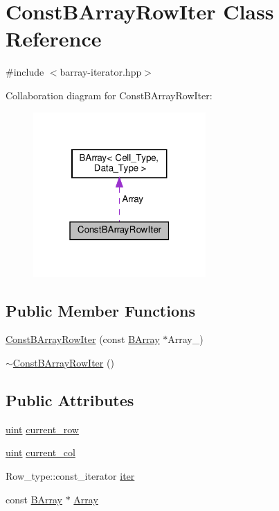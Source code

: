 \hypertarget{class_const_b_array_row_iter}{}\section{Const\+B\+Array\+Row\+Iter Class Reference}
\label{class_const_b_array_row_iter}


{\ttfamily \#include $<$barray-\/iterator.\+hpp$>$}



Collaboration diagram for Const\+B\+Array\+Row\+Iter\+:\nopagebreak
\begin{figure}[H]
\begin{center}
\leavevmode
\includegraphics[width=187pt]{class_const_b_array_row_iter__coll__graph}
\end{center}
\end{figure}
\subsection*{Public Member Functions}
\begin{DoxyCompactItemize}
\item 
\hyperlink{class_const_b_array_row_iter_a12fff3688dc55bdb336f5504736b6ebc}{Const\+B\+Array\+Row\+Iter} (const \hyperlink{class_b_array}{B\+Array} $\ast$Array\+\_\+)
\item 
\hyperlink{class_const_b_array_row_iter_aca51d35c5730466345e4c8bb303f619e}{$\sim$\+Const\+B\+Array\+Row\+Iter} ()
\end{DoxyCompactItemize}
\subsection*{Public Attributes}
\begin{DoxyCompactItemize}
\item 
\hyperlink{typedefs_8hpp_a91ad9478d81a7aaf2593e8d9c3d06a14}{uint} \hyperlink{class_const_b_array_row_iter_a50fcd44dc8ad4788e5814227fbf625d6}{current\+\_\+row}
\item 
\hyperlink{typedefs_8hpp_a91ad9478d81a7aaf2593e8d9c3d06a14}{uint} \hyperlink{class_const_b_array_row_iter_ae227ab3d9ed122274eefdf1de89686cc}{current\+\_\+col}
\item 
Row\+\_\+type\+::const\+\_\+iterator \hyperlink{class_const_b_array_row_iter_a327d031c9141eb0007d2fd7a528ebd76}{iter}
\item 
const \hyperlink{class_b_array}{B\+Array} $\ast$ \hyperlink{class_const_b_array_row_iter_a1c5a81b113e177015054e4950c688cfc}{Array}
\end{DoxyCompactItemize}


